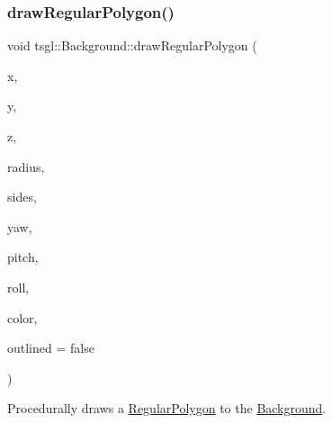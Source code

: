 \subsubsection{\texorpdfstring{draw\+Regular\+Polygon()}{drawRegularPolygon()}\hspace{0.1cm}{\footnotesize\ttfamily [1/2]}}
{\footnotesize\ttfamily void tsgl\+::\+Background\+::draw\+Regular\+Polygon (\begin{DoxyParamCaption}\item[{float}]{x,  }\item[{float}]{y,  }\item[{float}]{z,  }\item[{float}]{radius,  }\item[{int}]{sides,  }\item[{float}]{yaw,  }\item[{float}]{pitch,  }\item[{float}]{roll,  }\item[{\hyperlink{structtsgl_1_1_color_float}{Color\+Float}}]{color,  }\item[{bool}]{outlined = {\ttfamily false} }\end{DoxyParamCaption})\hspace{0.3cm}{\ttfamily [virtual]}}



Procedurally draws a \hyperlink{classtsgl_1_1_regular_polygon}{Regular\+Polygon} to the \hyperlink{classtsgl_1_1_background}{Background}. 

